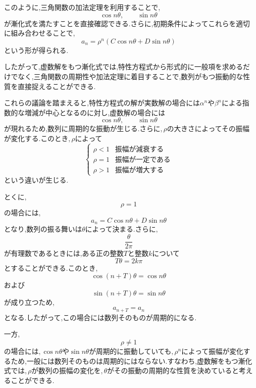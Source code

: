   このように,三角関数の加法定理を利用することで,
  \[
    \cos n\theta,\qquad \sin n\theta
  \]
  が漸化式を満たすことを直接確認できる.さらに,初期条件によってこれらを適切に組み合わせることで,
  \[
    a_n=\rho^n
    (C\cos n\theta+D\sin n\theta)
  \]
  という形が得られる.

  したがって,虚数解をもつ漸化式では,特性方程式から形式的に一般項を求めるだけでなく,三角関数の周期性や加法定理に着目することで,数列がもつ振動的な性質を直接捉えることができる.

  これらの議論を踏まえると,特性方程式の解が実数解の場合には$\alpha^n$や$\beta^n$による指数的な増減が中心となるのに対し,虚数解の場合には
  \[
    \cos n\theta,\qquad\sin n\theta
  \]
  が現れるため,数列に周期的な振動が生じる.さらに,\,$\rho$の大きさによってその振幅が変化する.このとき,\,$\rho$によって
  \[
    \begin{cases}
      \rho<1 & \text{振幅が減衰する}\\
      \rho=1 & \text{振幅が一定である}\\
      \rho>1 & \text{振幅が増大する}
    \end{cases}
  \]
  という違いが生じる.

  とくに,
  \[
    \rho=1
  \]
  の場合には,
  \[
    a_n=C\cos n\theta+D\sin n\theta
  \]
  となり,数列の振る舞いは$\theta$によって決まる.さらに,
  \[
    \frac{\theta}{2\pi}
  \]
  が有理数であるときには,ある正の整数$T$と整数$k$について
  \[
    T\theta=2k\pi
  \]
  とすることができる.このとき,
  \[
    \cos(n+T)\theta=\cos n\theta
  \]
  および
  \[
    \sin(n+T)\theta=\sin n\theta
  \]
  が成り立つため,
  \[
    a_{n+T}=a_n
  \]
  となる.したがって,この場合には数列そのものが周期的になる.

  一方,
  \[
    \rho\neq1
  \]
  の場合には,\,$\cos n\theta$や$\sin n\theta$が周期的に振動していても,\,$\rho^n$によって振幅が変化するため,一般には数列そのものは周期的にはならない.すなわち,虚数解をもつ漸化式では,\,$\rho$が数列の振幅の変化を,\,$\theta$がその振動の周期的な性質を決めていると考えることができる.